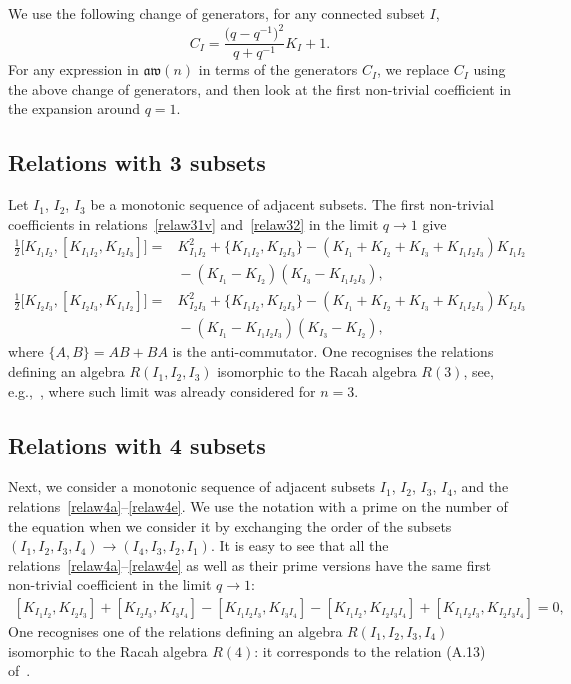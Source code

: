 \documentclass[pdftex]{sigma}
\numberwithin{equation}{section}
\theoremstyle{definition}
\newcommand{\aw}{\mathfrak{aw}(n)}
\begin{document}
We use the following change of generators, for any connected subset $I$,
\begin{equation*}
C_I = \frac{\big(q-q^{-1}\big)^2}{q+q^{-1}} K_I+1.
\end{equation*}
For any expression in $\aw$ in terms of the generators $C_I$, we replace $C_I$ using the above change of generators, and then look at the first non-trivial coefficient in the expansion around $q=1$.
\subsection{Relations with 3 subsets}
Let $I_1$, $I_2$, $I_3$ be a monotonic sequence of adjacent subsets.
The first non-trivial coefficients in relations~\eqref{relaw31v} and~\eqref{relaw32} in the limit $q\to1$ give
\begin{subequations}
\begin{align}
\label{eq:Rac1}
\frac{1}{2}\big[K_{I_1I_2}, [K_{I_1I_2},K_{I_2I_3}] \big] ={}& K_{I_1I_2}^2 + \{K_{I_1I_2},K_{I_2I_3}\} - (K_{I_1}+K_{I_2}+K_{I_3}+K_{I_1I_2I_3})K_{I_1I_2} \nonumber\\
&{}- (K_{I_1}-K_{I_2})(K_{I_3}-K_{I_1I_2I_3}) , \\
\label{eq:Rac2}
\frac{1}{2}\big[K_{I_2I_3}, [K_{I_2I_3},K_{I_1I_2}] \big] ={}& K_{I_2I_3}^2 + \{K_{I_1I_2},K_{I_2I_3}\} - (K_{I_1}+K_{I_2}+K_{I_3}+K_{I_1I_2I_3})K_{I_2I_3} \nonumber\\
&{}- (K_{I_1}-K_{I_1I_2I_3})(K_{I_3}-K_{I_2}) ,
\end{align}
\end{subequations}
where $\{A,B\}=AB+BA$ is the anti-commutator.
One recognises the relations defining an algebra $R(I_1,I_2,I_3)$ isomorphic to the Racah algebra $R(3)$, see, e.g.,~\cite{avatar}, where such limit was already considered for $n=3$.

\subsection{Relations with 4 subsets}
Next, we consider a monotonic sequence of adjacent subsets $I_1$, $I_2$, $I_3$, $I_4$, and the relations~\eqref{relaw4a}--\eqref{relaw4e}. We use the notation with a prime on the number of the equation
when we consider it by exchanging the order of the subsets $(I_1,I_2,I_3,I_4)\to(I_4,I_3,I_2,I_1)$.
It is easy to see that all the relations~\eqref{relaw4a}--\eqref{relaw4e} as well as their prime versions
have the same first non-trivial coefficient in the limit $q\to 1$:
\begin{gather}\label{eq:cub0}
 [K_{I_1I_2},K_{I_2I_3}]\! + \![K_{I_2I_3},K_{I_3I_4}]\! -\! [K_{I_1I_2I_3},K_{I_3I_4}]\! - \![K_{I_1I_2},K_{I_2I_3I_4}]\! + \![K_{I_1I_2I_3},K_{I_2I_3I_4}]\! = \!0,
\end{gather}
One recognises one of the relations defining an algebra $R(I_1,I_2,I_3,I_4)$ isomorphic to the Racah algebra $R(4)$:
it corresponds to the relation (A.13) of~\cite{CFR}.
\end{document}

